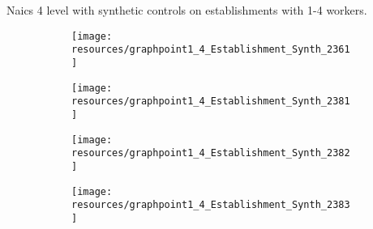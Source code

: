 \documentclass[12pt]{article}
\begin{document}
\pagebreak

Naics 4 level with synthetic controls on establishments with 1-4 workers.

\begin{center}
	\centering
	
\end{center}

\begin{center}
	\centering
	
\end{center}

\begin{center}
	\centering
	
\end{center}

\begin{center}
	\centering
	
\end{center}

\begin{center}
	\centering
	
\end{center}

\begin{center}
	\centering
	
\end{center}

\begin{center}
	\centering
	
\end{center}

\begin{figure}[H]
	\centering
	\begin{subfigure}[b]{0.4\textwidth}
	    \texttt{[image: resources/graphpoint1\_4\_Establishment\_Synth\_2361]}
	\end{subfigure}
	\begin{subfigure}[b]{0.4\textwidth}
	    \texttt{[image: resources/graphpoint1\_4\_Establishment\_Synth\_2381]}
	\end{subfigure}
\end{figure}

\begin{figure}[H]
	\centering
	\begin{subfigure}[b]{0.4\textwidth}
	    \texttt{[image: resources/graphpoint1\_4\_Establishment\_Synth\_2382]}
	\end{subfigure}
	\begin{subfigure}[b]{0.4\textwidth}
	    \texttt{[image: resources/graphpoint1\_4\_Establishment\_Synth\_2383]}
	\end{subfigure}
\end{figure}
\end{document}

